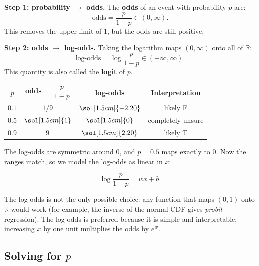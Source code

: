\documentclass[12pt, a4paper]{article}
\begin{document}
\textbf{Step 1: probability $\to$ odds.}
The \textbf{odds} of an event with probability $p$ are:
\[
  \text{odds} = \frac{p}{1 - p} \in (0, \infty).
\]
This removes the upper limit of $1$, but the odds are still positive.

\textbf{Step 2: odds $\to$ log-odds.}
Taking the logarithm maps $(0, \infty)$ onto all of $\mathbb{R}$:
\[
  \text{log-odds} = \log \frac{p}{1 - p} \in (-\infty, \infty).
\]
This quantity is also called the \textbf{logit} of $p$.




\begin{center}
  \renewcommand{\arraystretch}{1.3}
  \begin{tabular}{cccc}
    \toprule
    $p$   & odds $= \dfrac{p}{1-p}$ & log-odds             & Interpretation    \\
    \midrule
    $0.1$ & $1/9$                   & $\sol[1.5cm]{-2.20}$ & likely F          \\
    $0.5$ & $\sol[1.5cm]{1}$        & $\sol[1.5cm]{0}$     & completely unsure \\
    $0.9$ & $9$                     & $\sol[1.5cm]{2.20}$  & likely T          \\
    \bottomrule
  \end{tabular}
\end{center}

The log-odds are symmetric around $0$, and $p = 0.5$ maps exactly to $0$.
Now the ranges match, so we model the log-odds as linear in $x$:

\begin{equation}
  \log \frac{p}{1-p} = wx + b.
  \label{eq:logodds}
\end{equation}

\begin{notebox}
  The log-odds is not the only possible choice: any function that maps
  $(0, 1)$ onto $\mathbb{R}$ would work (for example, the inverse of the
  normal CDF gives \emph{probit} regression).
  The log-odds is preferred because it is simple and
  interpretable: increasing $x$ by one unit multiplies the odds by $e^{w}$.
\end{notebox}

\subsection{Solving for \texorpdfstring{$p$}{p}}
\end{document}
